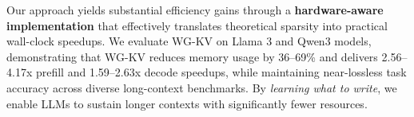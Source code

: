 Our approach yields substantial efficiency gains through a \textbf{hardware-aware implementation} that effectively translates theoretical sparsity into practical wall-clock speedups. We evaluate WG-KV on Llama 3 \cite{llama3} and Qwen3 \cite{qwen3} models, demonstrating that WG-KV reduces memory usage by 36--69\% and delivers 2.56--4.17x prefill and 1.59--2.63x decode speedups, while maintaining near-lossless task accuracy across diverse long-context benchmarks. By \textit{learning what to write}, we enable LLMs to sustain longer contexts with significantly fewer resources.